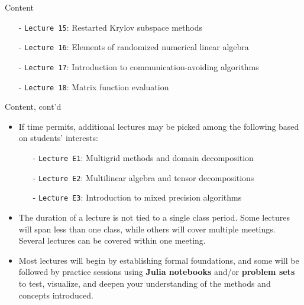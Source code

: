 \documentclass[t,usepdftitle=false]{beamer}
\begin{document}
\begin{frame}{Content}
\begin{itemize}
\begin{itemize}
\item[-] \texttt{Lecture 15}: Restarted Krylov subspace methods\vspace{.02cm}
\item[-] \texttt{Lecture 16}: Elements of randomized numerical linear algebra\vspace{.02cm}
\item[-] \texttt{Lecture 17}: Introduction to communication-avoiding algorithms\vspace{.02cm}
\item[-] \texttt{Lecture 18}: Matrix function evaluation
\end{itemize}
\end{itemize}
\end{frame}

\begin{frame}{Content, cont'd}
\begin{itemize}
\item If time permits, additional lectures may be picked among the following based on students' interests:
\begin{itemize}
\item[-] \texttt{Lecture E1}: Multigrid methods and domain decomposition\vspace{.04cm}
\item[-] \texttt{Lecture E2}: Multilinear algebra and tensor decompositions\vspace{.04cm}
\item[-] \texttt{Lecture E3}: Introduction to mixed precision algorithms
\end{itemize}
\item The duration of a lecture is not tied to a single class period.
Some lectures will span less than one class, while others will cover multiple meetings.
Several lectures can be covered within one meeting.
\item Most lectures will begin by establishing formal foundations, and some will be followed by practice sessions using \textbf{Julia notebooks} and/or \textbf{problem sets} to test, visualize, and deepen your understanding of the methods and concepts introduced.
\end{itemize}
\end{frame}
\end{document}
